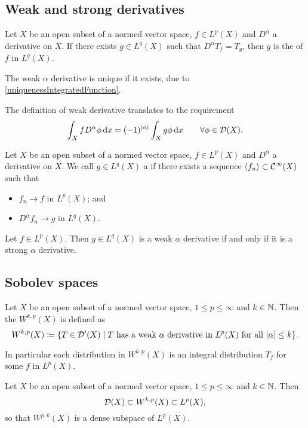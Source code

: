 \subsection{Weak and strong derivatives}
\begin{definition}
    Let $X$ be an open subset of a normed vector space, $f\in L^p(X)$ and $D^\alpha$ a derivative on $X$. If there exists $g\in L^q(X)$ such that $D^\alpha T_f = T_g$, then $g$ is the  of $f$ in $L^q(X)$.
\end{definition}
The weak $\alpha$ derivative is unique if it exists, due to \ref{uniquenessIntegratedFunction}.

The definition of weak derivative translates to the requirement
\[ \int_X f D^\alpha \phi \operatorname{d \!}{x} = (-1)^{|\alpha|}\int_X g\phi\operatorname{d \!}{x} \qquad \forall \phi\in\operatorname{\mathcal{D}}(X). \]

\begin{definition}
    Let $X$ be an open subset of a normed vector space, $f\in L^p(X)$ and $D^\alpha$ a derivative on $X$. We call $g\in L^q(X)$ a  if there exists a sequence $\left\langle f_n \right\rangle \subset \operatorname{\mathcal{C}}^\infty(X)$  such that
    \begin{itemize}
    \item $f_n \to f$ in $L^p(X)$; and
    \item $D^{\alpha}f_n \to g$ in $L^q(X)$.
    \end{itemize}
\end{definition}

\begin{theorem}
Let $f\in L^p(X)$. Then $g\in L^q(X)$ is a weak $\alpha$ derivative \textup{if and only if} it is a strong $\alpha$ derivative.
\end{theorem}

\subsection{Sobolev spaces}
\begin{definition}
Let $X$ be an open subset of a normed vector space, $1\leq p \leq \infty$ and $k\in\mathbb{N}$. Then the  $W^{k,p}(X)$ is defined as
\[ W^{k,p}(X) \defeq \setbuilder{T\in \dists(X)}{\text{$T$ has a weak $\alpha$ derivative in $L^p(X)$ for all $|\alpha|\leq k$}}.
 \]
\end{definition}
In particular each distribution in $W^{k,p}(X)$ is an integral distribution $T_f$ for some $f$ in $L^p(X)$.

\begin{lemma}
    Let $X$ be an open subset of a normed vector space, $1\leq p \leq \infty$ and $k\in\mathbb{N}$. Then
    \[ \operatorname{\mathcal{D}}(X) \subset W^{k,p}(X) \subset L^p(X), \]
    so that $W^{p,k}(X)$ is a dense subspace of $L^p(X)$.
\end{lemma}


